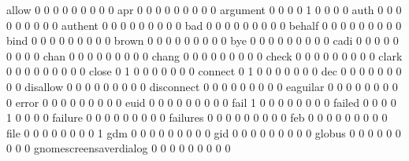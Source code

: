 \documentclass[compress,8pt]{beamer}
\begin{document}
\begin{frame}
\begin{Schunk}
  allow                                      0   0   0   0   0   0   0   0   0
  apr                                        0   0   0   0   0   0   0   0   0
  argument                                   0   0   0   0   1   0   0   0   0
  auth                                       0   0   0   0   0   0   0   0   0
  authent                                    0   0   0   0   0   0   0   0   0
  bad                                        0   0   0   0   0   0   0   0   0
  behalf                                     0   0   0   0   0   0   0   0   0
  bind                                       0   0   0   0   0   0   0   0   0
  brown                                      0   0   0   0   0   0   0   0   0
  bye                                        0   0   0   0   0   0   0   0   0
  cadi                                       0   0   0   0   0   0   0   0   0
  chan                                       0   0   0   0   0   0   0   0   0
  chang                                      0   0   0   0   0   0   0   0   0
  check                                      0   0   0   0   0   0   0   0   0
  clark                                      0   0   0   0   0   0   0   0   0
  close                                      0   1   0   0   0   0   0   0   0
  connect                                    0   1   0   0   0   0   0   0   0
  dec                                        0   0   0   0   0   0   0   0   0
  disallow                                   0   0   0   0   0   0   0   0   0
  disconnect                                 0   0   0   0   0   0   0   0   0
  eaguilar                                   0   0   0   0   0   0   0   0   0
  error                                      0   0   0   0   0   0   0   0   0
  euid                                       0   0   0   0   0   0   0   0   0
  fail                                       1   0   0   0   0   0   0   0   0
  failed                                     0   0   0   0   1   0   0   0   0
  failure                                    0   0   0   0   0   0   0   0   0
  failures                                   0   0   0   0   0   0   0   0   0
  feb                                        0   0   0   0   0   0   0   0   0
  file                                       0   0   0   0   0   0   0   0   1
  gdm                                        0   0   0   0   0   0   0   0   0
  gid                                        0   0   0   0   0   0   0   0   0
  globus                                     0   0   0   0   0   0   0   0   0
  gnomescreensaverdialog                     0   0   0   0   0   0   0   0   0

\end{Schunk}
\end{frame}
\end{document}
